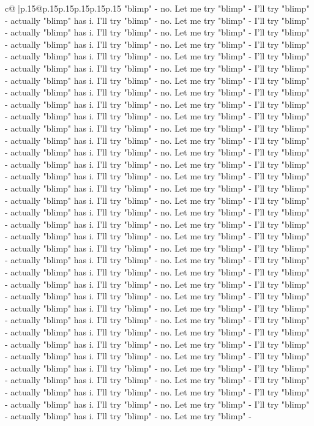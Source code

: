 \documentclass{article}
\begin{document}
{\begin{supertabular}{c@{$\;$}|p{.15\linewidth}@{}p{.15\linewidth}p{.15\linewidth}p{.15\linewidth}p{.15\linewidth}p{.15\linewidth}}
{{{"blimp" {-} no. Let me try "blimp" {-} I'll try "blimp" {-} actually "blimp" has i. I'll try "blimp" {-} no. Let me try "blimp" {-} I'll try "blimp" {-} actually "blimp" has i. I'll try "blimp" {-} no. Let me try "blimp" {-} I'll try "blimp" {-} actually "blimp" has i. I'll try "blimp" {-} no. Let me try "blimp" {-} I'll try "blimp" {-} actually "blimp" has i. I'll try "blimp" {-} no. Let me try "blimp" {-} I'll try "blimp" {-} actually "blimp" has i. I'll try "blimp" {-} no. Let me try "blimp" {-} I'll try "blimp" {-} actually "blimp" has i. I'll try "blimp" {-} no. Let me try "blimp" {-} I'll try "blimp" {-} actually "blimp" has i. I'll try "blimp" {-} no. Let me try "blimp" {-} I'll try "blimp" {-} actually "blimp" has i. I'll try "blimp" {-} no. Let me try "blimp" {-} I'll try "blimp" {-} actually "blimp" has i. I'll try "blimp" {-} no. Let me try "blimp" {-} I'll try "blimp" {-} actually "blimp" has i. I'll try "blimp" {-} no. Let me try "blimp" {-} I'll try "blimp" {-} actually "blimp" has i. I'll try "blimp" {-} no. Let me try "blimp" {-} I'll try "blimp" {-} actually "blimp" has i. I'll try "blimp" {-} no. Let me try "blimp" {-} I'll try "blimp" {-} actually "blimp" has i. I'll try "blimp" {-} no. Let me try "blimp" {-} I'll try "blimp" {-} actually "blimp" has i. I'll try "blimp" {-} no. Let me try "blimp" {-} I'll try "blimp" {-} actually "blimp" has i. I'll try "blimp" {-} no. Let me try "blimp" {-} I'll try "blimp" {-} actually "blimp" has i. I'll try "blimp" {-} no. Let me try "blimp" {-} I'll try "blimp" {-} actually "blimp" has i. I'll try "blimp" {-} no. Let me try "blimp" {-} I'll try "blimp" {-} actually "blimp" has i. I'll try "blimp" {-} no. Let me try "blimp" {-} I'll try "blimp" {-} actually "blimp" has i. I'll try "blimp" {-} no. Let me try "blimp" {-} I'll try "blimp" {-} actually "blimp" has i. I'll try "blimp" {-} no. Let me try "blimp" {-} I'll try "blimp" {-} actually "blimp" has i. I'll try "blimp" {-} no. Let me try "blimp" {-} I'll try "blimp" {-} actually "blimp" has i. I'll try "blimp" {-} no. Let me try "blimp" {-} I'll try "blimp" {-} actually "blimp" has i. I'll try "blimp" {-} no. Let me try "blimp" {-} I'll try "blimp" {-} actually "blimp" has i. I'll try "blimp" {-} no. Let me try "blimp" {-} I'll try "blimp" {-} actually "blimp" has i. I'll try "blimp" {-} no. Let me try "blimp" {-} I'll try "blimp" {-} actually "blimp" has i. I'll try "blimp" {-} no. Let me try "blimp" {-} I'll try "blimp" {-} actually "blimp" has i. I'll try "blimp" {-} no. Let me try "blimp" {-} I'll try "blimp" {-} actually "blimp" has i. I'll try "blimp" {-} no. Let me try "blimp" {-} I'll try "blimp" {-} actually "blimp" has i. I'll try "blimp" {-} no. Let me try "blimp" {-} I'll try "blimp" {-} actually "blimp" has i. I'll try "blimp" {-} no. Let me try "blimp" {-} I'll try "blimp" {-} actually "blimp" has i. I'll try "blimp" {-} no. Let me try "blimp" {-} I'll try "blimp" {-} actually "blimp" has i. I'll try "blimp" {-} no. Let me try "blimp" {-} I'll try "blimp" {-} actually "blimp" has i. I'll try "blimp" {-} no. Let me try "blimp" {-} I'll try "blimp" {-} actually "blimp" has i. I'll try "blimp" {-} no. Let me try "blimp" {-} }}}
\end{supertabular}}
\end{document}
